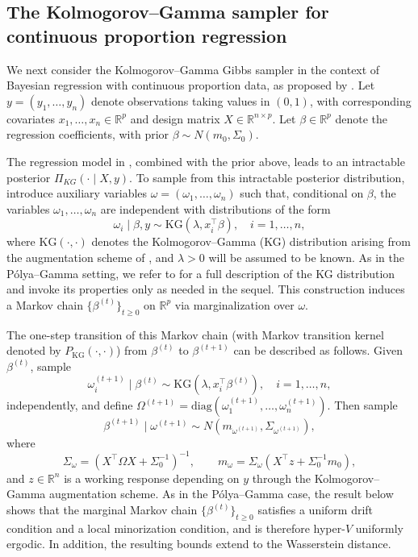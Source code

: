 \documentclass[ejsv2, noshowframe]{imsart}
\theoremstyle{plain}
\theoremstyle{definition}
\theoremstyle{remark}
\newcommand{\R}{\mathbb{R}}
\begin{document}
\subsection{The Kolmogorov--Gamma sampler for continuous proportion regression} \label{example:kg_sampler}

\noindent
We next consider the Kolmogorov--Gamma Gibbs sampler in the context of Bayesian regression with continuous proportion data, as proposed by \cite{LeeEtAlKG}. Let $y = (y_1,\dots,y_n)$ denote observations taking values in $(0,1)$, with corresponding covariates $x_1,\dots,x_n \in \R^p$ and design matrix $X \in \R^{n \times p}$. Let $\beta \in \R^p$ denote the regression coefficients, with prior $\beta \sim N(m_0, \Sigma_0)$.

The regression model in \cite{LeeEtAlKG}, combined with the prior above, leads to an intractable posterior $\Pi_{KG} (\cdot \mid X, y)$. To sample from this intractable posterior distribution, \cite{LeeEtAlKG} introduce auxiliary variables $\omega = (\omega_1,\dots,\omega_n)$ such that, conditional on $\beta$, the variables $\omega_1,\dots,\omega_n$ are independent with distributions of the form 
\[
\omega_i \mid \beta, y \sim \mathrm{KG}(\lambda, x_i^\top \beta), \quad i = 1,\dots,n,
\]
where $\mathrm{KG}(\cdot,\cdot)$ denotes the Kolmogorov--Gamma (KG) distribution arising from the augmentation scheme of \cite{LeeEtAlKG}, and $\lambda > 0$ will be assumed to be known.
As in the P\'olya--Gamma setting, we refer to \cite{LeeEtAlKG} for a full description of the KG distribution and invoke its properties only as needed in the sequel. 
This construction induces a Markov chain $\{\beta^{(t)}\}_{t \ge 0}$ on $\R^p$ via marginalization over $\omega$. 

The one-step transition of this Markov chain (with Markov transition kernel denoted by $P_{\mathrm{KG}}(\cdot, \cdot)$) from $\beta^{(t)}$ to $\beta^{(t+1)}$ can be described as follows. Given $\beta^{(t)}$, sample
\[
\omega_i^{(t+1)} \mid \beta^{(t)} \sim \mathrm{KG}(\lambda, x_i^\top \beta^{(t)}),
\quad i = 1,\dots,n,
\]
independently, and define $\Omega^{(t+1)} = \mathrm{diag}(\omega_1^{(t+1)},\dots,\omega_n^{(t+1)})$. Then sample
\[
\beta^{(t+1)} \mid \omega^{(t+1)} \sim N(m_{\omega^{(t+1)}}, \Sigma_{\omega^{(t+1)}}),
\]
where
\[
\Sigma_{\omega} = \left(X^\top \Omega X + \Sigma_0^{-1}\right)^{-1}, 
\qquad
m_{\omega} = \Sigma_{\omega} \left(X^\top z + \Sigma_0^{-1} m_0 \right),
\]
and $z \in \R^n$ is a working response depending on $y$ through the Kolmogorov--Gamma augmentation scheme. As in the P\'olya--Gamma case, the result below shows that the marginal Markov chain $\{\beta^{(t)}\}_{t\ge 0}$ satisfies a uniform drift condition and a local minorization condition, and is therefore hyper-$V$ uniformly ergodic. In addition, the resulting bounds extend to the Wasserstein distance.
\end{document}
